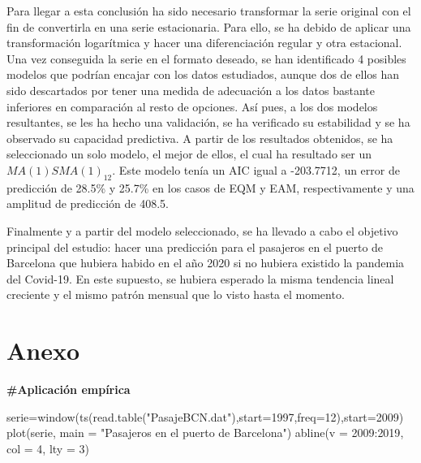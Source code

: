 \documentclass[
]{article}
\newenvironment{Shaded}{\begin{snugshade}}{\end{snugshade}}
\newcommand{\AttributeTok}[1]{\textcolor[rgb]{0.77,0.63,0.00}{#1}}
\newcommand{\DecValTok}[1]{\textcolor[rgb]{0.00,0.00,0.81}{#1}}
\newcommand{\FunctionTok}[1]{\textcolor[rgb]{0.00,0.00,0.00}{#1}}
\newcommand{\NormalTok}[1]{#1}
\newcommand{\OtherTok}[1]{\textcolor[rgb]{0.56,0.35,0.01}{#1}}
\newcommand{\SpecialCharTok}[1]{\textcolor[rgb]{0.00,0.00,0.00}{#1}}
\newcommand{\StringTok}[1]{\textcolor[rgb]{0.31,0.60,0.02}{#1}}
\begin{document}
Para llegar a esta conclusión ha sido necesario transformar la serie
original con el fin de convertirla en una serie estacionaria. Para ello,
se ha debido de aplicar una transformación logarítmica y hacer una
diferenciación regular y otra estacional. Una vez conseguida la serie en
el formato deseado, se han identificado 4 posibles modelos que podrían
encajar con los datos estudiados, aunque dos de ellos han sido
descartados por tener una medida de adecuación a los datos bastante
inferiores en comparación al resto de opciones. Así pues, a los dos
modelos resultantes, se les ha hecho una validación, se ha verificado su
estabilidad y se ha observado su capacidad predictiva. A partir de los
resultados obtenidos, se ha seleccionado un solo modelo, el mejor de
ellos, el cual ha resultado ser un \(MA(1)SMA(1)_{12}\). Este modelo
tenía un AIC igual a -203.7712, un error de predicción de 28.5\% y
25.7\% en los casos de EQM y EAM, respectivamente y una amplitud de
predicción de 408.5.

Finalmente y a partir del modelo seleccionado, se ha llevado a cabo el
objetivo principal del estudio: hacer una predicción para el pasajeros
en el puerto de Barcelona que hubiera habido en el año 2020 si no
hubiera existido la pandemia del Covid-19. En este supuesto, se hubiera
esperado la misma tendencia lineal creciente y el mismo patrón mensual
que lo visto hasta el momento.

\pagebreak

\hypertarget{anexo}{%
\section{Anexo}\label{anexo}}

\textbf{\#Aplicación empírica}

\begin{Shaded}
\begin{Highlighting}[]
\NormalTok{serie}\OtherTok{=}\FunctionTok{window}\NormalTok{(}\FunctionTok{ts}\NormalTok{(}\FunctionTok{read.table}\NormalTok{(}\StringTok{"PasajeBCN.dat"}\NormalTok{),}\AttributeTok{start=}\DecValTok{1997}\NormalTok{,}\AttributeTok{freq=}\DecValTok{12}\NormalTok{),}\AttributeTok{start=}\DecValTok{2009}\NormalTok{)}
\FunctionTok{plot}\NormalTok{(serie, }\AttributeTok{main =} \StringTok{"Pasajeros en el puerto de Barcelona"}\NormalTok{)}
\FunctionTok{abline}\NormalTok{(}\AttributeTok{v =} \DecValTok{2009}\SpecialCharTok{:}\DecValTok{2019}\NormalTok{, }\AttributeTok{col =} \DecValTok{4}\NormalTok{, }\AttributeTok{lty =} \DecValTok{3}\NormalTok{)}
\end{Highlighting}
\end{Shaded}
\end{document}

